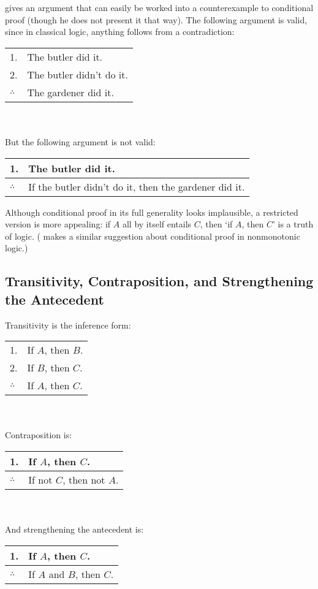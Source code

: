 \citet{stalnaker-indicative} gives an argument that can easily be worked into a counterexample to conditional proof (though he does not present it that way).  The following argument is valid, since in classical logic, anything follows from a contradiction:\smallskip\\
\begin{tabular}{ll}
1. & The butler did it.\\
2. & The butler didn't do it.\\
\hline
$\therefore$ & The gardener did it.
\end{tabular}\\\smallskip\\
But the following argument is not valid:\smallskip\\
\begin{tabular}{ll}
1. & The butler did it.\\
\hline
$\therefore$ & If the butler didn't do it, then the gardener did it.
\end{tabular}

\medskip

Although conditional proof in its full generality looks implausible, a restricted version is more appealing: if $A$ all by itself entails $C$, then `if $A$, then $C$' is a truth of logic.  (\citet{koons-sep}  makes a similar suggestion about conditional proof in nonmonotonic logic.)

\subsection{Transitivity, Contraposition, and Strengthening the Antecedent}
\label{strengthening}

Transitivity is the inference form:\smallskip\\
\begin{tabular}{ll}
1. & If $A$, then $B$.\\
2. & If $B$, then $C$.\\
\hline
$\therefore$ & If $A$, then $C$.
\end{tabular}\\\smallskip\\
Contraposition is:\smallskip\\
\begin{tabular}{ll}
1. & If $A$, then $C$.\\
\hline
$\therefore$ & If not $C$, then not $A$.
\end{tabular}\\\smallskip\\
And strengthening the antecedent is:\smallskip\\
\begin{tabular}{ll}
1. & If $A$, then $C$.\\
\hline
$\therefore$ & If $A$ and $B$, then $C$.
\end{tabular}

